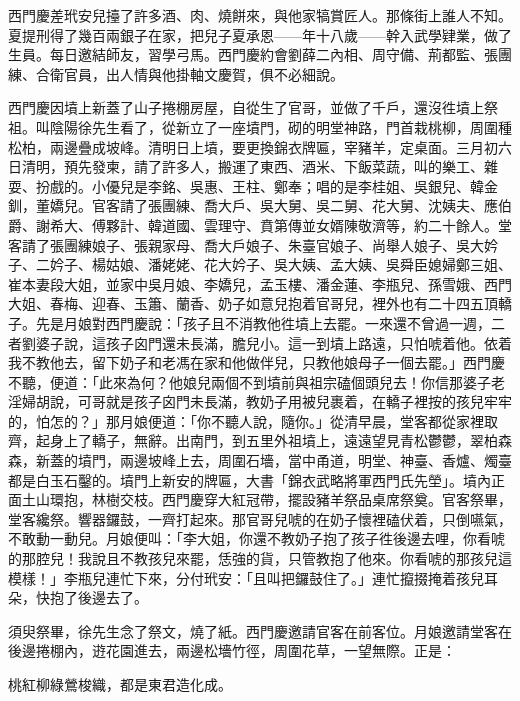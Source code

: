 西門慶差玳安兒擡了許多酒、肉、燒餅來，與他家犒賞匠人。那條街上誰人不知。夏提刑得了幾百兩銀子在家，把兒子夏承恩——年十八歲——幹入武學肄業，做了生員。{}每日邀結師友，習學弓馬。西門慶約會劉薛二內相、周守備、荊都監、張團練、合衛官員，出人情與他掛軸文慶賀，俱不必細說。

西門慶因墳上新蓋了山子捲棚房屋，自從生了官哥，並做了千戶，還沒徃墳上祭祖。叫陰陽徐先生看了，從新立了一座墳門，砌的明堂神路，門首栽桃柳，周圍種松柏，兩邊疊成坡峰。清明日上墳，要更換錦衣牌匾，宰豬羊，定桌面。三月初六日清明，預先發柬，請了許多人，搬運了東西、酒米、下飯菜蔬，叫的樂工、雜耍、扮戲的。小優兒是李銘、吳惠、王柱、鄭奉；唱的是李桂姐、吳銀兒、韓金釧，董嬌兒。官客請了張團練、喬大戶、吳大舅、吳二舅、花大舅、沈姨夫、應伯爵、謝希大、傅夥計、韓道國、雲理守、賁第傳並女婿陳敬濟等，約二十餘人。堂客請了張團練娘子、張親家母、喬大戶娘子、朱臺官娘子、尚舉人娘子、吳大妗子、二妗子、楊姑娘、潘姥姥、花大妗子、吳大姨、孟大姨、吳舜臣媳婦鄭三姐、崔本妻段大姐，並家中吳月娘、李嬌兒，孟玉樓、潘金蓮、李瓶兒、孫雪娥、西門大姐、春梅、迎春、玉簫、蘭香、奶子如意兒抱着官哥兒，裡外也有二十四五頂轎子。先是月娘對西門慶說：「孩子且不消教他徃墳上去罷。一來還不曾過一週，二者劉婆子說，這孩子囟門還未長滿，膽兒小。這一到墳上路遠，只怕唬着他。{}依着我不教他去，留下奶子和老馮在家和他做伴兒，只教他娘母子一個去罷。」西門慶不聽，便道：「此來為何？他娘兒兩個不到墳前與祖宗磕個頭兒去！你信那婆子老淫婦胡說，可哥就是孩子囟門未長滿，教奶子用被兒裹着，在轎子裡按的孩兒牢牢的，怕怎的？」那月娘便道：「你不聽人說，隨你。」從清早晨，堂客都從家裡取齊，起身上了轎子，無辭。出南門，到五里外祖墳上，遠遠望見青松鬱鬱，翠柏森森，新蓋的墳門，兩邊坡峰上去，周圍石墻，當中甬道，明堂、神臺、香爐、燭臺都是白玉石鑿的。墳門上新安的牌匾，大書「錦衣武略將軍西門氏先塋」。墳內正面土山環抱，林樹交枝。西門慶穿大紅冠帶，擺設豬羊祭品桌席祭奠。官客祭畢，堂客纔祭。響器鑼鼓，一齊打起來。那官哥兒唬的在奶子懷裡磕伏着，只倒嚥氣，不敢動一動兒。月娘便叫：「李大姐，你還不教奶子抱了孩子徃後邊去哩，你看唬的那腔兒！{}我說且不教孩兒來罷，恁強的貨，只管教抱了他來。你看唬的那孩兒這模樣！」李瓶兒連忙下來，分付玳安：「且叫把鑼鼓住了。」連忙攛掇掩着孩兒耳朵，快抱了後邊去了。

須臾祭畢，徐先生念了祭文，燒了紙。西門慶邀請官客在前客位。月娘邀請堂客在後邊捲棚內，逰花園進去，兩邊松墻竹徑，周圍花草，一望無際。正是：

\begin{myquote}
桃紅柳綠鶯梭織，都是東君造化成。
\end{myquote}

